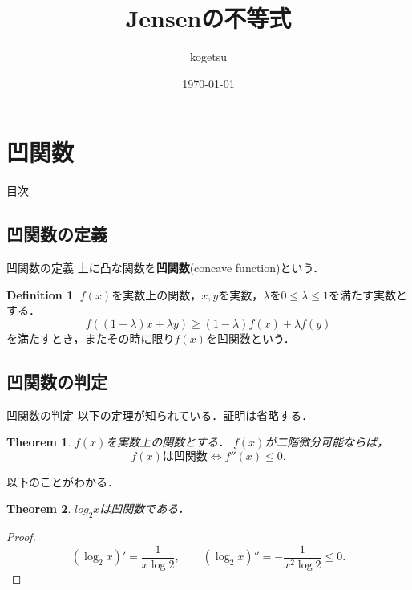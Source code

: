 \documentclass[dvipdfmx]{beamer}
\title{
    Jensenの不等式
}
\author{kogetsu}
\date{\today}
\theoremstyle{plain}
\newtheorem{thm}{Theorem}
\theoremstyle{definition}
\newtheorem{dfn}{Definition}
\begin{document}
\maketitle

\section{凹関数}
\begin{frame}{目次}
	\tableofcontents[currentsection]
\end{frame}

\subsection{凹関数の定義}
\begin{frame}{凹関数の定義}
    上に凸な関数を\textbf{凹関数}(concave function)という\cite{lit:proof}．
    \begin{dfn}
        $f(x)$を実数上の関数，$x,y$を実数，$\lambda$を$0 \le \lambda \le 1$を満たす実数とする．
        \[
            f((1-\lambda)x + \lambda y) \ge (1-\lambda)f(x) + \lambda f(y)
        \]
        を満たすとき，またその時に限り$f(x)$を凹関数という．
    \end{dfn}
\end{frame}

\subsection{凹関数の判定}
\begin{frame}{凹関数の判定}
    以下の定理が知られている．証明は省略する．

    \begin{thm}
        $f(x)$を実数上の関数とする． $f(x)$が二階微分可能ならば，
        \[
            \text{$f(x)$は凹関数} \iff f''(x) \le 0.
        \]
    \end{thm}

    以下のことがわかる．

    \begin{thm}
        $log_2 x$は凹関数である．
    \end{thm}

    \begin{proof}
        \[
            (\log_2 x)' = \frac{1}{x \log 2}, \qquad
            (\log_2 x)'' = -\frac{1}{x^2 \log 2} \le 0.
        \]
    \end{proof}
\end{frame}
\end{document}

